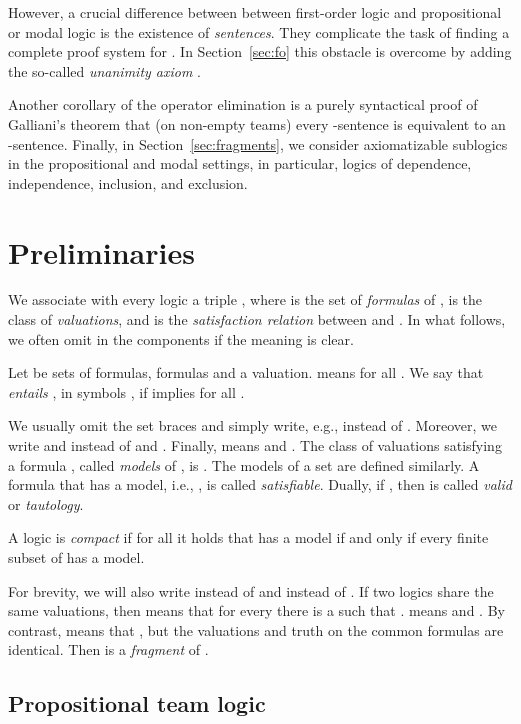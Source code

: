 \documentclass[a4paper,english,fleqn,11pt,final]{scrartcl}
\makeatletter
\newcommand{\ie}{i.e.\@\xspace}
\newcommand{\eg}{e.g.\@\xspace}
\theoremstyle{plain}
\theoremstyle{definition}
\makeatother
\begin{document}
However, a crucial difference between between first-order logic and propositional or modal logic is the existence of \emph{sentences}.
They complicate the task of finding a complete proof system for .
In Section~\ref{sec:fo} this obstacle is overcome by adding the so-called \emph{unanimity axiom} .

Another corollary of the operator elimination is a purely syntactical proof of Galliani's theorem \cite{Galliani14} that (on non-empty teams) every -sentence is equivalent to an -sentence.
Finally, in Section~\ref{sec:fragments}, we consider axiomatizable sublogics in the propositional and modal settings, in particular, logics of dependence, independence, inclusion, and exclusion.
 

\section{Preliminaries}


\label{sec:prelim}


We associate with every logic  a triple , where  is the set of \emph{formulas} of ,  is the class of \emph{valuations}, and  is the \emph{satisfaction relation} between  and .
In what follows, we often omit  in the components if the meaning is clear.

\medskip

Let  be sets of formulas,  formulas and  a valuation.
 means  for all .
We say that  \emph{entails} , in symbols , if  implies  for all .

We usually omit the set braces and simply write, \eg,  instead of .
Moreover, we write  and  instead of  and .
Finally,  means  and .
The class of valuations satisfying a formula , called \emph{models} of , is .
The models  of a set  are defined similarly.
A formula  that has a model, \ie, , is called \emph{satisfiable}.
Dually, if , then  is called \emph{valid} or \emph{tautology}.

A logic  is \emph{compact} if for all  it holds that  has a model if and only if every finite subset of  has a model.

For brevity, we will also write  instead of  and  instead of .
If two logics  share the same valuations, then  means that for every  there is a  such that .  means  and .
By contrast,  means that , but the valuations and truth on the common formulas are identical. Then  is a \emph{fragment} of .

\subsection{Propositional team logic}
\end{document}
